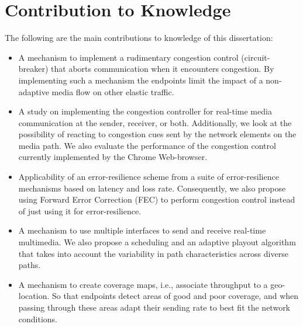 \section{Contribution to Knowledge}

The following are the main contributions to knowledge of this dissertation:

\begin{itemize}
\setlength{\itemsep}{0pt}


\item A mechanism to implement a rudimentary congestion control (circuit-
breaker) that aborts communication when it encounters congestion. By
implementing such a mechanism the endpoints limit the impact of a non-adaptive
media flow on other elastic traffic.

\item A study on implementing the congestion controller for real-time media
communication at the sender, receiver, or both. Additionally, we look at the
possibility of reacting to congestion cues sent by the network elements on the
media path. We also evaluate the performance of the congestion control
currently implemented by the Chrome Web-browser.

\item Applicability of an error-resilience scheme from a suite of
error-resilience mechanisms based on latency and loss rate. Consequently, we
also propose using Forward Error Correction (FEC) to perform congestion
control instead of just using it for error-resilience.

\item A mechanism to use multiple interfaces to send and receive real-time
multimedia. We also propose a scheduling and an adaptive playout algorithm
that takes into account the variability in path characteristics across diverse
paths.

\item A mechanism to create coverage maps, i.e., associate throughput to a
geo-location. So that endpoints detect areas of good and poor coverage, and
when passing through these areas adapt their sending rate to best fit the
network conditions.

\end{itemize}

